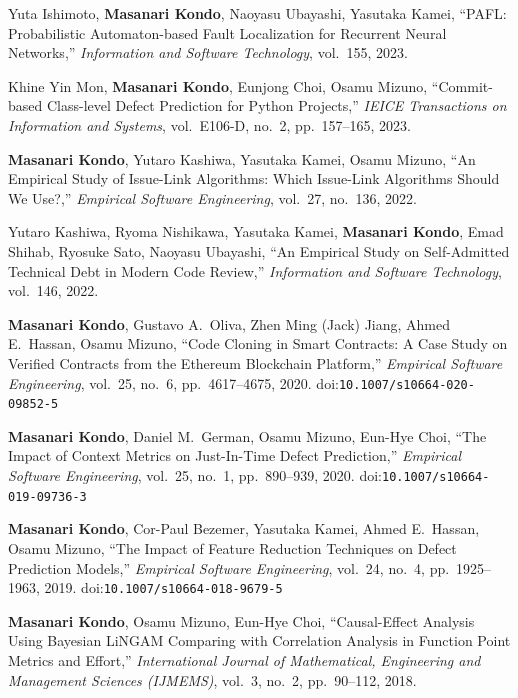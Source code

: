 \documentclass[10pt,a4paper]{article}
\newcommand{\me}{\textbf{Masanari Kondo}}
\begin{document}
\begin{publist}[label={[J\arabic*]}]
  \item Yuta Ishimoto, \me, Naoyasu Ubayashi, Yasutaka Kamei, ``PAFL: Probabilistic Automaton-based Fault Localization for Recurrent Neural Networks,'' \textit{Information and Software Technology}, vol.\ 155, 2023.
  \item Khine Yin Mon, \me, Eunjong Choi, Osamu Mizuno, ``Commit-based Class-level Defect Prediction for Python Projects,'' \textit{IEICE Transactions on Information and Systems}, vol.\ E106-D, no.\ 2, pp.\ 157--165, 2023.
  \item \me, Yutaro Kashiwa, Yasutaka Kamei, Osamu Mizuno, ``An Empirical Study of Issue-Link Algorithms: Which Issue-Link Algorithms Should We Use?,'' \textit{Empirical Software Engineering}, vol.\ 27, no.\ 136, 2022.
  \item Yutaro Kashiwa, Ryoma Nishikawa, Yasutaka Kamei, \me, Emad Shihab, Ryosuke Sato, Naoyasu Ubayashi, ``An Empirical Study on Self-Admitted Technical Debt in Modern Code Review,'' \textit{Information and Software Technology}, vol.\ 146, 2022.
  \item \me, Gustavo A.\ Oliva, Zhen Ming (Jack) Jiang, Ahmed E.\ Hassan, Osamu Mizuno, ``Code Cloning in Smart Contracts: A Case Study on Verified Contracts from the Ethereum Blockchain Platform,'' \textit{Empirical Software Engineering}, vol.\ 25, no.\ 6, pp.\ 4617--4675, 2020. doi:\nolinkurl{10.1007/s10664-020-09852-5}
  \item \me, Daniel M.\ German, Osamu Mizuno, Eun-Hye Choi, ``The Impact of Context Metrics on Just-In-Time Defect Prediction,'' \textit{Empirical Software Engineering}, vol.\ 25, no.\ 1, pp.\ 890--939, 2020. doi:\nolinkurl{10.1007/s10664-019-09736-3}
  \item \me, Cor-Paul Bezemer, Yasutaka Kamei, Ahmed E.\ Hassan, Osamu Mizuno, ``The Impact of Feature Reduction Techniques on Defect Prediction Models,'' \textit{Empirical Software Engineering}, vol.\ 24, no.\ 4, pp.\ 1925--1963, 2019. doi:\nolinkurl{10.1007/s10664-018-9679-5}
  \item \me, Osamu Mizuno, Eun-Hye Choi, ``Causal-Effect Analysis Using Bayesian LiNGAM Comparing with Correlation Analysis in Function Point Metrics and Effort,'' \textit{International Journal of Mathematical, Engineering and Management Sciences (IJMEMS)}, vol.\ 3, no.\ 2, pp.\ 90--112, 2018.
\end{publist}
\end{document}

